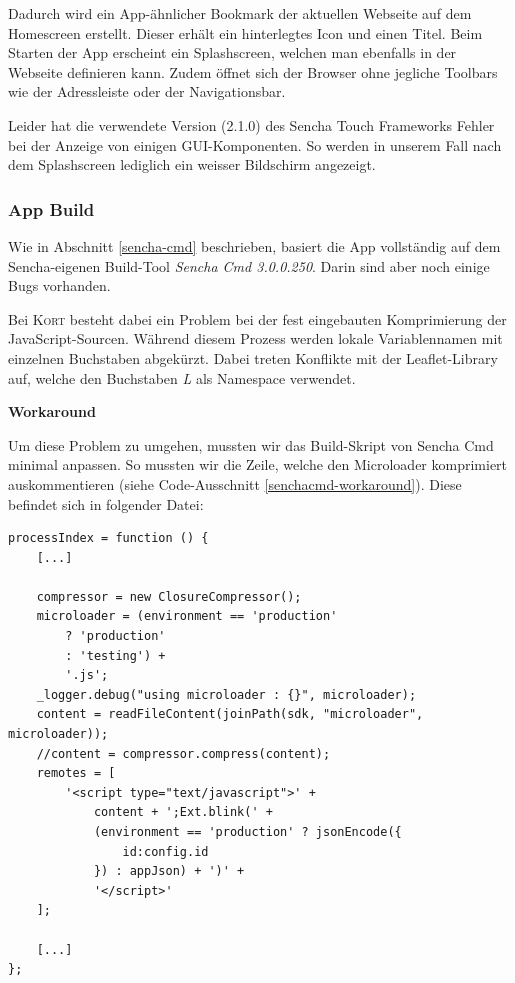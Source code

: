 Dadurch wird ein App-ähnlicher Bookmark der aktuellen Webseite auf dem Homescreen erstellt.
Dieser erhält ein hinterlegtes Icon und einen Titel.
Beim Starten der App erscheint ein Splashscreen, welchen man ebenfalls in der Webseite definieren kann. Zudem öffnet sich der Browser ohne jegliche Toolbars wie der Adressleiste oder der Navigationsbar.

Leider hat die verwendete Version (2.1.0) des Sencha Touch Frameworks Fehler bei der Anzeige von einigen GUI-Komponenten.
So werden in unserem Fall nach dem Splashscreen lediglich ein weisser Bildschirm angezeigt.

\subsubsection{App Build}
Wie in Abschnitt \ref{sencha-cmd} beschrieben, basiert die App vollständig auf dem Sencha-eigenen Build-Tool \emph{Sencha Cmd 3.0.0.250}. Darin sind aber noch einige Bugs vorhanden.

Bei \textsc{Kort} besteht dabei ein Problem bei der fest eingebauten Komprimierung der JavaScript-Sourcen.
Während diesem Prozess werden lokale Variablennamen mit einzelnen Buchstaben abgekürzt.
Dabei treten Konflikte mit der Leaflet-Library auf, welche den Buchstaben \emph{L} als Namespace verwendet.

\textbf{Workaround}

Um diese Problem zu umgehen, mussten wir das Build-Skript von Sencha Cmd minimal anpassen.
So mussten wir die Zeile, welche den \gls{Microloader} komprimiert auskommentieren (siehe Code-Ausschnitt \ref{senchacmd-workaround}).
Diese befindet sich in folgender Datei:



\lstset{language=JavaScript}
\begin{lstlisting}[float, caption=Sencha Cmd Workaround, label=senchacmd-workaround]
processIndex = function () {
	[...]
	
	compressor = new ClosureCompressor();
	microloader = (environment == 'production'
		? 'production'
		: 'testing') +
		'.js';
	_logger.debug("using microloader : {}", microloader);
	content = readFileContent(joinPath(sdk, "microloader", microloader));
	//content = compressor.compress(content);
	remotes = [
		'<script type="text/javascript">' +
			content + ';Ext.blink(' +
			(environment == 'production' ? jsonEncode({
				id:config.id
			}) : appJson) + ')' +
			'</script>'
	];
	
	[...]
};
\end{lstlisting}